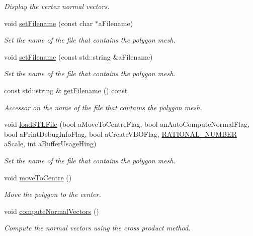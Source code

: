 \begin{DoxyCompactItemize}
\begin{DoxyCompactList}\small\item\em Display the vertex normal vectors. \end{DoxyCompactList}\item 
void \hyperlink{class_graphics_1_1_triangle_mesh_abb11091003f5a96b1ed5fefa17de7ad4}{setFilename} (const char $\ast$aFilename)
\begin{DoxyCompactList}\small\item\em Set the name of the file that contains the polygon mesh. \end{DoxyCompactList}\item 
void \hyperlink{class_graphics_1_1_triangle_mesh_a4cbfb0430a24f0369e31bcba04c2a13a}{setFilename} (const std::string \&aFilename)
\begin{DoxyCompactList}\small\item\em Set the name of the file that contains the polygon mesh. \end{DoxyCompactList}\item 
const std::string \& \hyperlink{class_graphics_1_1_triangle_mesh_abf08bcc810eb706892c32d653b17caf9}{getFilename} () const 
\begin{DoxyCompactList}\small\item\em Accessor on the name of the file that contains the polygon mesh. \end{DoxyCompactList}\item 
void \hyperlink{class_graphics_1_1_triangle_mesh_ae3fa5bbc167ad814727ce2a7c6868372}{loadSTLFile} (bool aMoveToCentreFlag, bool anAutoComputeNormalFlag, bool aPrintDebugInfoFlag, bool aCreateVBOFlag, \hyperlink{namespace_utilities_a40969b96bd8d847b962e297cb79f08ce}{RATIONAL\_\-NUMBER} aScale, int aBufferUsageHing)
\begin{DoxyCompactList}\small\item\em Set the name of the file that contains the polygon mesh. \end{DoxyCompactList}\item 
void \hyperlink{class_graphics_1_1_triangle_mesh_a441adcf4bb07f505963f16647ef7b642}{moveToCentre} ()
\begin{DoxyCompactList}\small\item\em Move the polygon to the center. \end{DoxyCompactList}\item 
void \hyperlink{class_graphics_1_1_triangle_mesh_ad256fd2f1397c66f30149b63f1d298e8}{computeNormalVectors} ()
\begin{DoxyCompactList}\small\item\em Compute the normal vectors using the cross product method. \end{DoxyCompactList}\item 

\end{DoxyCompactItemize}
